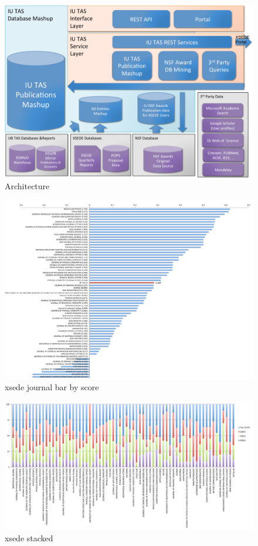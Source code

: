 \documentclass{sig-alternate}
\begin{document}
\begin{figure}[htb] 
  \centering 
    \includegraphics[width=1.0\columnwidth]{images-new/architecture.pdf} 
  \caption{Architecture}\label{F:architecture} 
\end{figure} 

\begin{figure}[htb] 
  \centering 
    \includegraphics[width=1.0\textwidth]{images-new/xsede-journal-bar-by-score.pdf} 
  \caption{xsede journal bar by score}\label{F:xsede-score} 
\end{figure} 

\begin{figure}[htb] 
  \centering 
    \includegraphics[width=1.0\textwidth]{images-new/xsede-journal-stacked.pdf} 
  \caption{xsede stacked}\label{F:xsede-stacked} 
\end{figure} 
\end{document}
